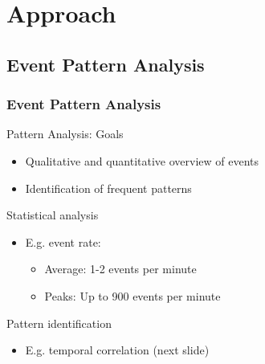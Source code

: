 \documentclass[10pt]{beamer}
\begin{document}
\section{Approach}

\subsection{Event Pattern Analysis}

\begin{frame}
	\frametitle{Event Pattern Analysis}
	\begin{block}{Pattern Analysis: Goals}
		\begin{itemize}
			\item Qualitative and quantitative overview of events
			\item Identification of frequent patterns
		\end{itemize}
	\end{block}
	\begin{block}{Statistical analysis}
		\begin{itemize}
			\item E.g. event rate:
				\begin{itemize}
					\item Average: 1-2 events per minute
					\item Peaks: Up to 900 events per minute
				\end{itemize}
		\end{itemize}
	\end{block}
	\begin{block}{Pattern identification}
		\begin{itemize}
			\item E.g. temporal correlation (next slide)
		\end{itemize}
	\end{block}
\end{frame}
\end{document}
